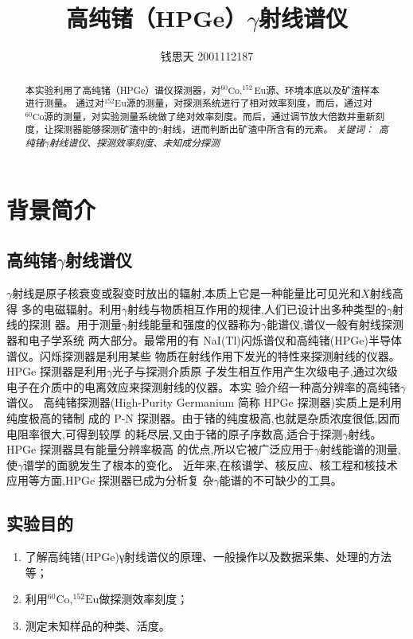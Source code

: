 \documentclass{article}
\title{高纯锗（HPGe）$\gamma$射线谱仪}
\author{钱思天 2001112187}
\begin{document}
    \maketitle
    \begin{abstract}
        本实验利用了高纯锗（HPGe）谱仪探测器，对$^{60}\text{Co},^{152}\text{Eu}$源、环境本底以及矿渣样本进行测量。
        通过对$^{152}\text{Eu}$源的测量，对探测系统进行了相对效率刻度，而后，通过对$^{60}\text{Co}$源的测量，对实验测量系统做了绝对效率刻度。而后，通过调节放大倍数并重新刻度，让探测器能够探测矿渣中的$\gamma$射线，进而判断出矿渣中所含有的元素。
        \newline
        \newline
        {\emph{ 关键词：\ 高纯锗$\gamma$射线谱仪、探测效率刻度、未知成分探测 }\rm}

    \end{abstract}

    \section{背景简介}
    \subsection{高纯锗$\gamma$射线谱仪}
    $\gamma$射线是原子核衰变或裂变时放出的辐射,本质上它是一种能量比可见光和$X$射线高得
多的电磁辐射。利用$\gamma$射线与物质相互作用的规律,人们已设计出多种类型的$\gamma$射线的探测
器。用于测量$\gamma$射线能量和强度的仪器称为$\gamma$能谱仪,谱仪一般有射线探测器和电子学系统
两大部分。最常用的有 NaI(Tl)闪烁谱仪和高纯锗(HPGe)半导体谱仪。闪烁探测器是利用某些
物质在射线作用下发光的特性来探测射线的仪器。HPGe 探测器是利用$\gamma$光子与探测介质原
子发生相互作用产生次级电子,通过次级电子在介质中的电离效应来探测射线的仪器。本实
验介绍一种高分辨率的高纯锗$\gamma$谱仪。
高纯锗探测器(High-Purity Germanium 简称 HPGe 探测器)实质上是利用纯度极高的锗制
成的 P-N 探测器。由于锗的纯度极高,也就是杂质浓度很低,因而电阻率很大,可得到较厚
的耗尽层,又由于锗的原子序数高,适合于探测$\gamma$射线。HPGe 探测器具有能量分辨率极高
的优点,所以它被广泛应用于$\gamma$射线能谱的测量,使$\gamma$谱学的面貌发生了根本的变化。
近年来,在核谱学、核反应、核工程和核技术应用等方面,HPGe 探测器已成为分析复
杂$\gamma$能谱的不可缺少的工具。
\subsection{实验目的}
\begin{enumerate}
    \item 了解高纯锗(HPGe)γ射线谱仪的原理、一般操作以及数据采集、处理的方法等；
    \item 利用$^{60}\text{Co}$,$^{152}\text{Eu}$做探测效率刻度；
    \item 测定未知样品的种类、活度。
\end{enumerate}
\end{document}
